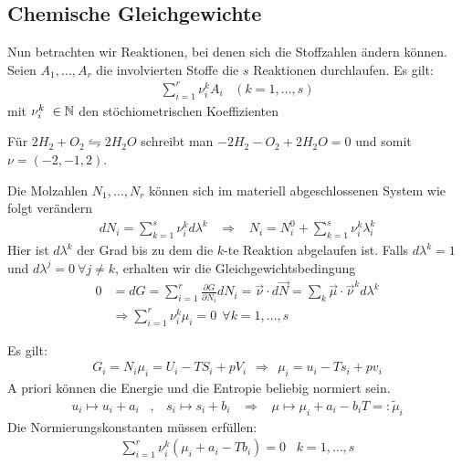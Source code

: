 \subsection{Chemische Gleichgewichte}

Nun betrachten wir Reaktionen, bei denen sich die Stoffzahlen ändern können.
Seien $A_1,\dots,A_r$ die involvierten Stoffe die $s$ Reaktionen durchlaufen.
Es gilt:
\begin{align*}
    \sum_{i=1}^r \nu_i^k A_i
    \hspace{10pt} (k=1,\dots,s)
\end{align*}
mit $\nu_i^k \ \in \mathbb{N}$ den stöchiometrischen Koeffizienten

\begin{beispiel}
    Für $2 H_2 + O_2 \leftrightharpoons 2 H_2 O$ schreibt man
    $-2 H_2 - O_2 + 2 H_2 O = 0$ und somit $\nu = (-2,-1,2)$.
\end{beispiel}

Die Molzahlen $N_1,\dots,N_r$ können sich im materiell abgeschlossenen System
wie folgt verändern
\begin{align*}
    d N_i = \sum_{k=1}^s \nu_i^k d \lambda^k
    \hspace{10pt} \Rightarrow \hspace{10pt}
    N_i = N_i^0 + \sum_{k=1}^s \nu_i^k \lambda_i^k
\end{align*}
Hier ist $d \lambda^k$ der Grad bis zu dem die $k$-te Reaktion abgelaufen ist.
Falls $d \lambda^k = 1$ und $d \lambda^j = 0 \ \forall j \neq k$, erhalten
wir die Gleichgewichtsbedingung
\begin{align*}
    0 &= d G = \sum_{i=1}^r \frac{\partial G}{\partial N_i} d N_i
    = \vec{\nu} \cdot d \vec{N}
    = \sum_k \vec{\mu} \cdot \vec{\nu}^k d \lambda^k
    \\
    &\Rightarrow
    \sum_{i=1}^r \nu_i^k \mu_i = 0 \ \ \forall k = 1,\dots,s
\end{align*}

\begin{bemerkung}
    Es gilt:
    \begin{align*}
        G_i = N_i \mu_i = U_i - T S_i + p V_i
        \ \ \Rightarrow \ \
        \mu_i = u_i - T s_i + p v_i
    \end{align*}
    A priori können die Energie und die Entropie beliebig normiert sein.
    \begin{align*}
        u_i \mapsto u_i + a_i
        \hspace{10pt} , \hspace{10pt}
        s_i \mapsto s_i + b_i
        \hspace{10pt} \Rightarrow \hspace{10pt}
        \mu \mapsto \mu_i + a_i - b_i T =: \tilde{\mu}_i
    \end{align*}
    Die Normierungskonstanten müssen erfüllen:
    \begin{align*}
        \sum_{i=1}^r \nu_i^k (\mu_i + a_i - T b_i) = 0
        \hspace{10pt}
        k=1,\dots,s
    \end{align*}
\end{bemerkung}

